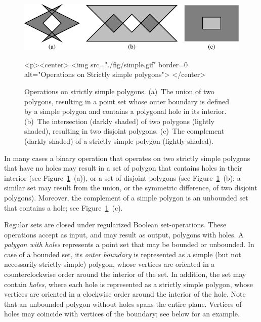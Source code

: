 \begin{figure}[!htp]
\begin{ccTexOnly}
  \begin{center}
  \includegraphics{Boolean_set_operations_2/fig/simple}
  \end{center}
\end{ccTexOnly}
\label{fig:simple}
\begin{ccHtmlOnly}
  <p><center>
    <img src="./fig/simple.gif" border=0 alt="Operations on Strictly
    simple polygons">
  </center>
\end{ccHtmlOnly}
\caption{Operations on strictly simple polygons. (a)~The union of two
polygons, resulting in a point set whose outer boundary is defined by
a simple polygon and contains a polygonal hole in its interior. (b)~The
intersection (darkly shaded) of two polygons (lightly shaded), resulting
in two disjoint polygons. (c)~The complement (darkly shaded) of a strictly
simple polygon (lightly shaded).} 
\end{figure}

In many cases a binary operation that operates on two strictly simple
polygons that have no holes may result in a set of polygon that
contains holes in their interior (see Figure~\ref{fig:simple}~(a)), 
or a set of disjoint polygons (see Figure~\ref{fig:simple}~(b); a similar
set may result from the union, or the symmetric difference, of two disjoint
polygons). Moreover, the complement of a simple polygon is an unbounded set
that contains a hole; see Figure~\ref{fig:simple}~(c).

Regular sets are closed under regularized Boolean set-operations.
These operations accept as input, and may result as output, polygons
with holes. A {\em polygon with holes} represents a point set that may be bounded
or unbounded. In case of a bounded set, its {\em outer boundary} is represented
as a simple (but not necessarily strictly simple) polygon, whose vertices
are oriented in a counterclockwise order around the interior of the set.
In addition, the set may contain {\em holes}, where each hole is represented
as a strictly simple polygon, whose vertices are oriented in a clockwise
order around the interior of the hole. Note that an unbounded polygon
without holes spans the entire plane. Vertices of holes may coincide
with vertices of the boundary; see below for an example.


